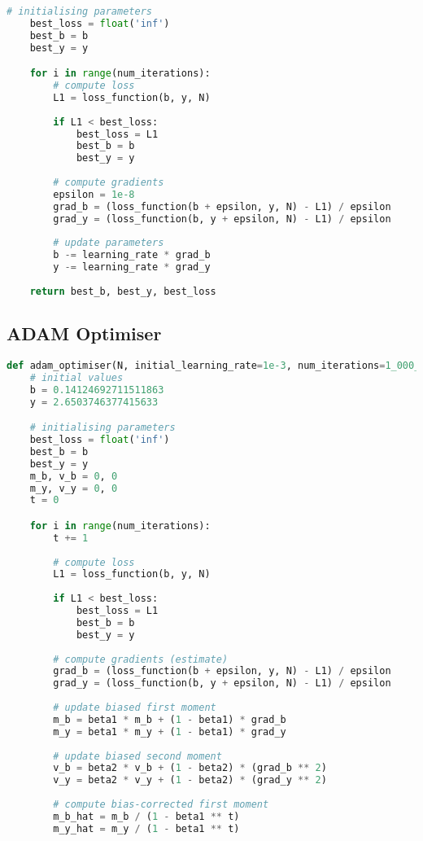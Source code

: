 \begin{appendices}
\begin{lstlisting}[language=Python, caption= null]
    # initialising parameters
    best_loss = float('inf')
    best_b = b
    best_y = y

    for i in range(num_iterations):
        # compute loss
        L1 = loss_function(b, y, N)
        
        if L1 < best_loss:
            best_loss = L1
            best_b = b
            best_y = y
        
        # compute gradients 
        epsilon = 1e-8
        grad_b = (loss_function(b + epsilon, y, N) - L1) / epsilon
        grad_y = (loss_function(b, y + epsilon, N) - L1) / epsilon
        
        # update parameters
        b -= learning_rate * grad_b
        y -= learning_rate * grad_y
    
    return best_b, best_y, best_loss
\end{lstlisting}

\subsection{ADAM Optimiser}
\begin{lstlisting}[language=Python, caption= null]
def adam_optimiser(N, initial_learning_rate=1e-3, num_iterations=1_000_000, beta1=0.9, beta2=0.999, epsilon=1e-5):
	# initial values
    b = 0.14124692711511863
    y = 2.6503746377415633

	# initialising parameters
    best_loss = float('inf')
    best_b = b
    best_y = y
    m_b, v_b = 0, 0
    m_y, v_y = 0, 0
    t = 0

    for i in range(num_iterations):
        t += 1
        
        # compute loss
        L1 = loss_function(b, y, N)
        
        if L1 < best_loss:
            best_loss = L1
            best_b = b
            best_y = y
        
        # compute gradients (estimate)
        grad_b = (loss_function(b + epsilon, y, N) - L1) / epsilon
        grad_y = (loss_function(b, y + epsilon, N) - L1) / epsilon
        
        # update biased first moment
        m_b = beta1 * m_b + (1 - beta1) * grad_b
        m_y = beta1 * m_y + (1 - beta1) * grad_y
        
        # update biased second moment
        v_b = beta2 * v_b + (1 - beta2) * (grad_b ** 2)
        v_y = beta2 * v_y + (1 - beta2) * (grad_y ** 2)
        
        # compute bias-corrected first moment
        m_b_hat = m_b / (1 - beta1 ** t)
        m_y_hat = m_y / (1 - beta1 ** t)
        

\end{lstlisting}
\end{appendices}
